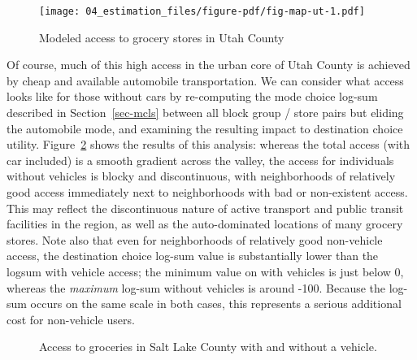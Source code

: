 \documentclass[
  letterpaper,
  authoryear,
  review,
  3p]{elsarticle}
\begin{document}
\begin{figure}

{\centering \texttt{[image: 04\_estimation\_files/figure-pdf/fig-map-ut-1.pdf]}

}

\caption{\label{fig-map-ut}Modeled access to grocery stores in Utah
County}

\end{figure}

Of course, much of this high access in the urban core of Utah County is
achieved by cheap and available automobile transportation. We can
consider what access looks like for those without cars by re-computing
the mode choice log-sum described in Section~\ref{sec-mcls} between all
block group / store pairs but eliding the automobile mode, and examining
the resulting impact to destination choice utility.
Figure~\ref{fig-map-nocar} shows the results of this analysis: whereas
the total access (with car included) is a smooth gradient across the
valley, the access for individuals without vehicles is blocky and
discontinuous, with neighborhoods of relatively good access immediately
next to neighborhoods with bad or non-existent access. This may reflect
the discontinuous nature of active transport and public transit
facilities in the region, as well as the auto-dominated locations of
many grocery stores. Note also that even for neighborhoods of relatively
good non-vehicle access, the destination choice log-sum value is
substantially lower than the logsum with vehicle access; the minimum
value on with vehicles is just below 0, whereas the \emph{maximum}
log-sum without vehicles is around -100. Because the log-sum occurs on
the same scale in both cases, this represents a serious additional cost
for non-vehicle users.

\begin{figure}

\begin{minipage}[t]{0.50\linewidth}

{\centering 


}

\end{minipage}%
%
\begin{minipage}[t]{0.50\linewidth}

{\centering 


}

\end{minipage}%

\caption{\label{fig-map-nocar}Access to groceries in Salt Lake County
with and without a vehicle.}

\end{figure}
\end{document}
